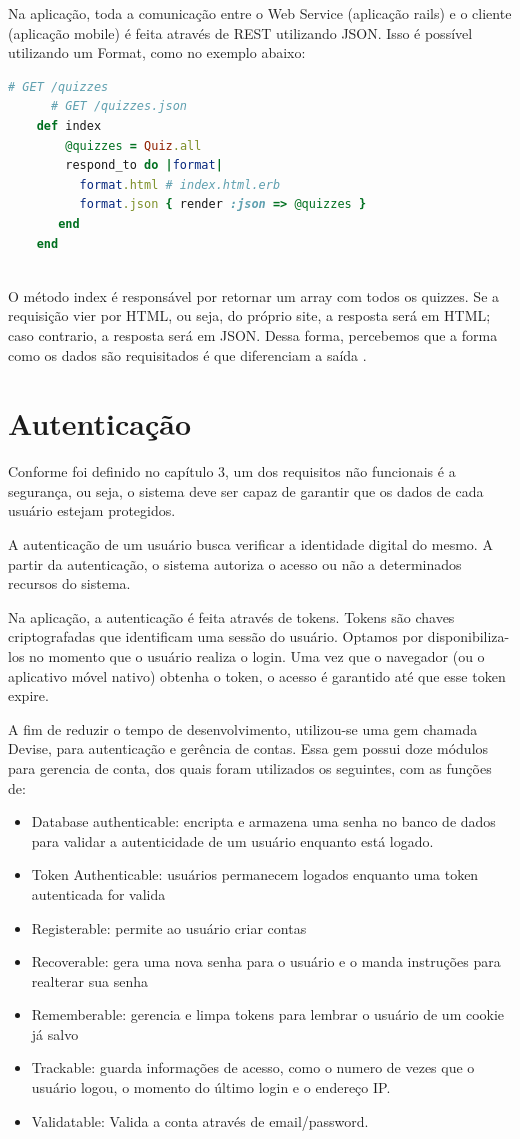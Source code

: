             Na aplicação, toda a comunicação entre o Web Service (aplicação rails) e o cliente (aplicação mobile) é feita através de \ac{REST} utilizando \ac{JSON}. Isso é possível utilizando um Format, como no exemplo abaixo:
\begin{lstlisting}[language=Ruby]
    # GET /quizzes
      # GET /quizzes.json
    def index
        @quizzes = Quiz.all
    	respond_to do |format|
          format.html # index.html.erb
          format.json { render :json => @quizzes }
   	   end
    end
     
 \end{lstlisting} 
            O método index é responsável por retornar um array com todos os quizzes. Se a requisição vier por \ac{HTML}, ou seja, do próprio site, a resposta será em \ac{HTML}; caso contrario, a resposta será em \ac{JSON}. Dessa forma, percebemos que a forma como os dados são requisitados é que diferenciam a saída .
     
    \section{Autenticação}
            Conforme foi definido no capítulo 3, um dos requisitos não funcionais é a segurança, ou seja, o sistema deve ser capaz de garantir que os dados de cada usuário estejam protegidos.
			
            A autenticação de um usuário busca verificar a identidade digital do mesmo. A partir da autenticação, o sistema autoriza o acesso ou não a determinados recursos do sistema.
			
           Na aplicação, a autenticação é feita através de tokens. Tokens são chaves criptografadas que identificam uma sessão do usuário. Optamos por disponibiliza-los no momento que o usuário realiza o login. Uma vez que o navegador (ou o aplicativo móvel nativo) obtenha o token, o acesso é garantido até que esse token expire.
			
            A fim de reduzir o tempo de desenvolvimento, utilizou-se uma gem chamada Devise, para autenticação e gerência de contas. Essa gem possui doze módulos para gerencia de conta, dos quais foram utilizados os seguintes, com as funções de:
\begin{itemize}
\item Database authenticable: encripta e armazena uma senha no banco de dados para validar a autenticidade de um usuário enquanto está logado.
\item Token Authenticable: usuários permanecem logados enquanto uma token autenticada for valida
\item Registerable: permite ao usuário criar contas
\item Recoverable: gera uma nova senha para o usuário e o manda instruções para realterar sua senha
\item Rememberable: gerencia e limpa tokens para lembrar o usuário de um cookie já salvo
\item Trackable: guarda informações de acesso, como o numero de vezes que o usuário logou, o momento do último login e o endereço IP.
\item Validatable: Valida a conta através de email/password.
\end{itemize}   
  
